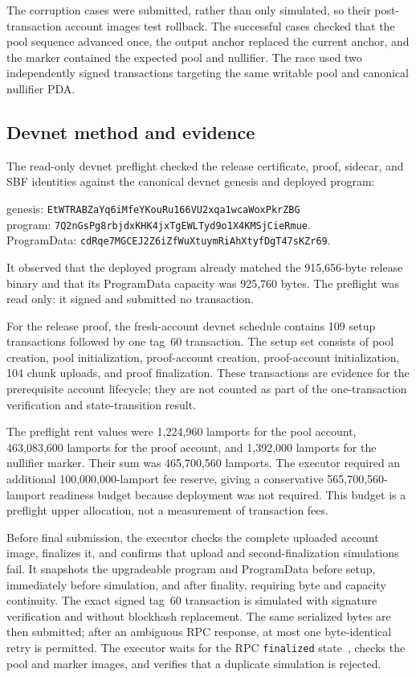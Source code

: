 The corruption cases were submitted, rather than only simulated, so their
post-transaction account images test rollback.  The successful cases checked
that the pool sequence advanced once, the output anchor replaced the current
anchor, and the marker contained the expected pool and nullifier.  The race
used two independently signed transactions targeting the same writable pool
and canonical nullifier PDA\@.

\subsection{Devnet method and evidence}
\label{sec:evaluation-devnet}

The read-only devnet preflight checked the release certificate, proof, sidecar,
and SBF identities against the canonical devnet genesis and deployed program:
\begin{center}
  \small
  genesis:\quad
  \texttt{EtWTRABZaYq6iMfeYKouRu166VU2xqa1wcaWoxPkrZBG}\\
  program:\quad
  \texttt{7Q2nGsPg8rbjdxKHK4jxTgEWLTyd9o1X4KMSjCieRmue}.\\
  ProgramData:\quad
  \texttt{cdRqe7MGCEJ2Z6iZfWuXtuymRiAhXtyfDgT47sKZr69}.
\end{center}
It observed that the deployed program already matched the 915,656-byte release
binary and that its ProgramData capacity was 925,760 bytes.  The preflight was
read only: it signed and submitted no transaction.

For the release proof, the fresh-account devnet schedule contains 109 setup
transactions followed by one tag~60 transaction.  The setup set consists of
pool creation, pool initialization, proof-account creation, proof-account
initialization, 104 chunk uploads, and proof finalization.  These transactions
are evidence for the prerequisite account lifecycle; they are not counted as
part of the one-transaction verification and state-transition result.

The preflight rent values were 1,224,960 lamports for the pool account,
463,083,600 lamports for the proof account, and 1,392,000 lamports for the
nullifier marker.  Their sum was 465,700,560 lamports.  The executor required
an additional 100,000,000-lamport fee reserve, giving a conservative
565,700,560-lamport readiness budget because deployment was not required.
This budget is a preflight upper allocation, not a measurement of transaction
fees.

Before final submission, the executor checks the complete uploaded account
image, finalizes it, and confirms that upload and second-finalization
simulations fail.  It snapshots the upgradeable program and ProgramData before
setup, immediately before simulation, and after finality, requiring byte and
capacity continuity.  The exact signed tag~60 transaction is simulated with
signature verification and without blockhash replacement.  The same serialized
bytes are then submitted; after an ambiguous RPC response, at most one
byte-identical retry is permitted.  The executor waits for the RPC
\texttt{finalized} state~\cite{SolanaRPC}, checks the pool and marker images,
and verifies that a duplicate simulation is rejected.

